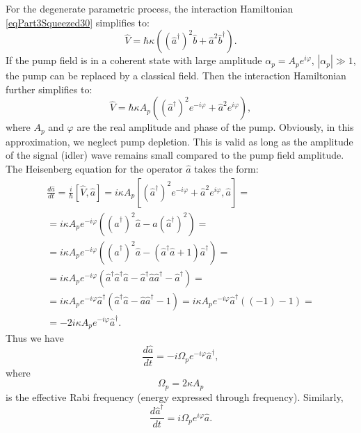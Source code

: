For the degenerate parametric process, the interaction Hamiltonian
\eqref{eqPart3Squeezed30} simplifies to:
\begin{equation}
\hat{V} = \hbar \kappa \left(
\left(\hat{a}^{\dag}\right)^2 \hat{b} + 
\hat{a}^2 \hat{b}^{\dag}
\right).
\nonumber
\end{equation}
If the pump field is in a coherent state with large
amplitude $\alpha_p = A_p e^{i \varphi}$, $\left|\alpha_p\right| \gg
1$, the pump can be replaced by a classical field. Then the interaction
Hamiltonian 
further simplifies to:
\begin{equation}
\hat{V} = \hbar \kappa A_p\left(
\left(\hat{a}^{\dag}\right)^2 e^{- i \varphi} + 
\hat{a}^2 e^{i \varphi}
\right),
\nonumber
\end{equation}
where $A_p$ and $\varphi$ are the real amplitude and phase
of the pump. Obviously, in this approximation, we neglect pump depletion. This is valid
as long as the amplitude of the signal (idler)
wave remains small compared to the pump field amplitude. The Heisenberg equation
for the operator $\hat{a}$ takes the form:
\begin{eqnarray}
\frac{d\hat{a}}{dt} = \frac{i}{\hbar}
\left[\hat{V}, \hat{a}\right] = i \kappa A_p
\left[
\left(\hat{a}^{\dag}\right)^2 e^{- i \varphi} + 
\hat{a}^2 e^{i \varphi},
\hat{a}
\right] = 
\nonumber \\
=
i \kappa A_p e^{- i \varphi}
\left(
\left(
\hat{a}^{\dag}\right)^2  \hat{a} -
\hat{a}
\left(
\hat{a}^{\dag}\right)^2
\right) = 
\nonumber \\
=
i \kappa A_p e^{- i \varphi}
\left(
\left(
\hat{a}^{\dag}\right)^2  \hat{a} -
\left(\hat{a}^{\dag}\hat{a} + 1\right)
\hat{a}^{\dag}
\right) = 
\nonumber \\
=
i \kappa A_p e^{- i \varphi}
\left(
\hat{a}^{\dag}\hat{a}^{\dag}  \hat{a} -
\hat{a}^{\dag}\hat{a}\hat{a}^{\dag} -
\hat{a}^{\dag}
\right) = 
\nonumber \\
=
i \kappa A_p e^{- i \varphi}
\hat{a}^{\dag}
\left(
\hat{a}^{\dag}  \hat{a} -
\hat{a}\hat{a}^{\dag} -
1
\right) = 
i \kappa A_p e^{- i \varphi}
\hat{a}^{\dag}
\left(
\left(-1\right) -
1
\right) =
\nonumber \\
= 
- 2 i \kappa A_p e^{- i \varphi}
\hat{a}^{\dag}.
\nonumber
\end{eqnarray}
Thus we have
\begin{equation}
\frac{d\hat{a}}{dt} = 
- i \Omega_p e^{- i \varphi}
\hat{a}^{\dag},
\label{eqPart3Squeezed34a}
\end{equation}
where 
\[
\Omega_p = 2 \kappa A_p
\]
is the effective Rabi frequency (energy expressed through frequency).
Similarly,
\begin{equation}
\frac{d\hat{a}^{\dag}}{dt} = 
i \Omega_p e^{i \varphi}
\hat{a}.
\label{eqPart3Squeezed34b}
\end{equation}

